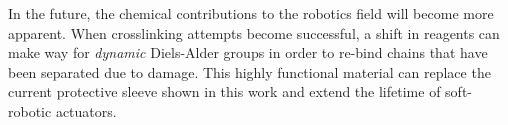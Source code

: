 In the future, the chemical contributions to the robotics field will become more apparent. When crosslinking attempts become successful, a shift in reagents can make way for \textit{dynamic} Diels-Alder groups in order to re-bind chains that have been separated due to damage. This highly functional material can replace the current protective sleeve shown in this work and extend the lifetime of soft-robotic actuators.  






